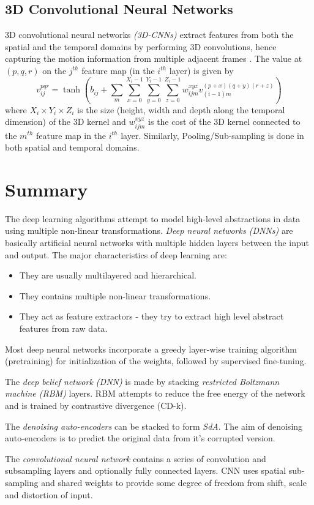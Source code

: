 \subsection{3D Convolutional Neural Networks}
3D convolutional neural networks \textit{(3D-CNNs)} extract features from both the spatial and the temporal domains by performing 3D convolutions, hence capturing the motion information from multiple adjacent frames \cite{ji20133d}. The value at $(p, q, r)$ on the $j^{th}$ feature map (in the $i^{th}$ layer) is given by
$$v^{pqr}_{ij} = \tanh(b_{ij}+\sum_{m} \sum_{x=0}^{X_i-1} \sum_{y=0}^{Y_i-1} \sum_{z=0}^{Z_i-1} w^{xyz}_{ijm} v^{(p+x)(q+y)(r+z)}_{(i−1)m}) $$
where $X_i \times Y_i \times Z_i$ is the size (height, width and depth  along the temporal dimension) of the 3D kernel and $w^{xyz}_{ijm}$ is the cost of the 3D kernel connected to the $m^{th}$ feature map in the $i^{th}$ layer.  Similarly, Pooling/Sub-sampling is done in both spatial and temporal domains.

\section{Summary}
The deep learning algorithms attempt to model high-level abstractions in data using multiple non-linear transformations.  \textit{Deep neural networks (DNNs)} are basically artificial neural networks with multiple hidden layers between the input and output.  The major characteristics of deep learning are:
\begin{itemize}
\item They are usually multilayered and hierarchical.
\item They contains multiple non-linear transformations.
\item They act as feature extractors - they try to extract high level abstract features from raw data.
\end{itemize}

Most deep neural networks incorporate a greedy layer-wise training algorithm (pretraining) for initialization of the weights, followed by supervised fine-tuning.
 
The \textit{deep belief network (DNN)} is made by stacking \textit{restricted Boltzmann machine (RBM)} layers.  RBM attempts to reduce the free energy of the network and is trained by contrastive divergence (CD-k).

The \textit{denoising auto-encoders} can be stacked to form \textit{SdA}.  The aim of denoising auto-encoders is to predict the original data from it's corrupted version.

The \textit{convolutional neural network} contains a series of convolution and subsampling layers and optionally fully connected layers.  CNN uses spatial sub-sampling and shared weights to provide some degree of freedom from shift, scale and distortion of input.
